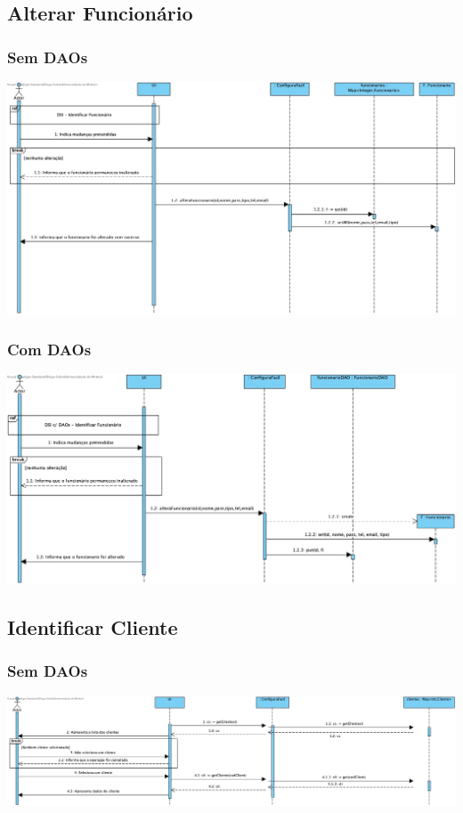 \subsection{Alterar Funcionário}
\subsubsection{Sem DAOs}
\begin{center}
 	\includegraphics[width = 5.5in]{DSI/DSI-Alterar_Funcionario.jpg}
\end{center}
\subsubsection{Com DAOs}
\begin{center}
 	\includegraphics[width = 5.5in]{DSI_D/DSI-DAOs-Alterar_Funcionario.jpg}
\end{center}


\subsection{Identificar Cliente}
\subsubsection{Sem DAOs}
\begin{center}
 	\includegraphics[width = 5.5in]{DSI/DSI-Identificar_Cliente.jpg}
\end{center}
